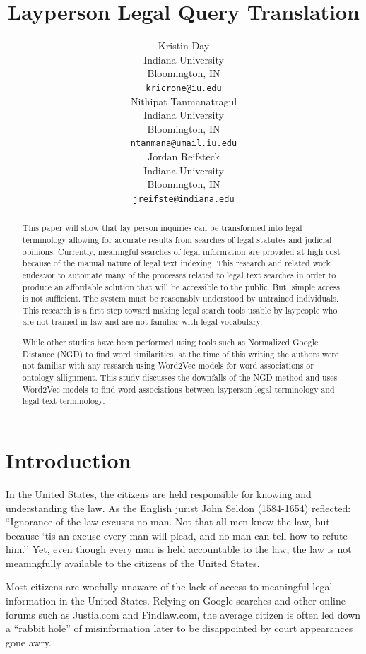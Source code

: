 \documentclass[11pt]{article}
\title{Layperson Legal Query Translation}
\author{Kristin Day \\
  Indiana University \\
  Bloomington, IN \\
  {\tt kricrone@iu.edu} \\\And
  Nithipat Tanmanatragul \\
  Indiana University \\
  Bloomington, IN \\
  {\tt ntanmana@umail.iu.edu} \\\And
  Jordan Reifsteck \\
  Indiana University \\
  Bloomington, IN \\
  {\tt jreifste@indiana.edu} \\ }
\date{}
\begin{document}
\maketitle
\begin{abstract}
This paper will show that lay person inquiries can be transformed into legal terminology allowing for accurate results from searches of legal statutes and judicial opinions.  Currently, meaningful searches of legal information are provided at high cost because of the manual nature of legal text indexing.  This research and related work endeavor to automate many of the processes related to legal text searches in order to produce an affordable solution that will be accessible to the public.  But, simple access is not sufficient.  The system must be reasonably understood by untrained individuals.  This research is a first step toward making legal search tools usable by laypeople who are not trained in law and are not familiar with legal vocabulary.

While other studies have been performed using tools such as Normalized Google Distance (NGD) to find word similarities, at the time of this writing the authors were not familiar with any research using Word2Vec models for word associations or ontology allignment.  This study discusses the downfalls of the NGD method and uses Word2Vec models to find word associations between layperson legal terminology and legal text terminology.
\end{abstract}

\section{Introduction}
In the United States, the citizens are held responsible for knowing and understanding the law.  As the English jurist John Seldon (1584-1654) reflected: ``Ignorance of the law excuses no man. Not that all men know the law, but because `tis an excuse every man will plead, and no man can tell how to refute him.''  Yet, even though every man is held accountable to the law, the law is not meaningfully available to the citizens of the United States.

Most citizens are woefully unaware of the lack of access to meaningful legal information in the United States.  Relying on Google searches and other online forums such as Justia.com and Findlaw.com, the average citizen is often led down a ``rabbit hole''\cite[p.~33]{Bruce2000}  of misinformation later to be disappointed by court appearances gone awry.  
\end{document}
